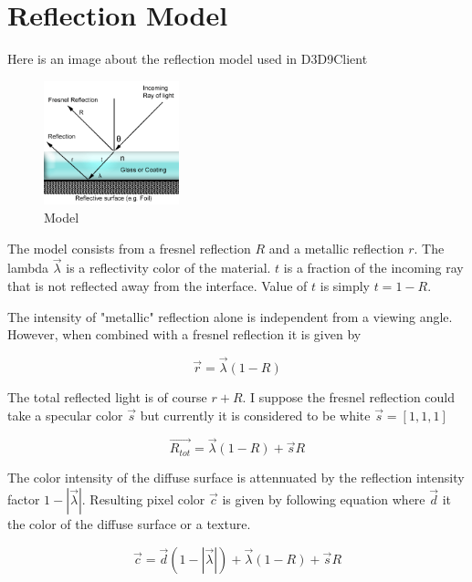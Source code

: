 \documentclass[twocolumn]{report}
\newenvironment{twocol}[0]{%
\begin{list}{}{%
\onecolumn
\setlength{\leftmargin}{0cm}%
\setlength{\rightmargin}{0cm}%
}%
\item[]}{\end{list}}
\begin{document}
\begin{twocol}
\newpage

\section*{Reflection Model}

Here is an image about the reflection model used in D3D9Client

\begin{figure}[h]
	\centering
	\includegraphics[width=0.35\textwidth]{Fresnel.png}
	\caption{Model}
\end{figure}

The model consists from a fresnel reflection $R$ and a metallic reflection $r$. The lambda $\vec{\lambda}$ is a reflectivity color of the material. $t$ is a fraction of the incoming ray that is not reflected away from the interface. Value of $t$ is simply $t=1-R$.

The intensity of "metallic" reflection alone is independent from a viewing angle. However, when combined with a fresnel reflection it is given by

\begin{equation}
 \vec{r} = \vec{\lambda}(1-R)
\end{equation}

The total reflected light is of course $r+R$. I suppose the fresnel reflection could take a specular color $\vec{s}$ but currently it is considered to be white $\vec{s}=[1,1,1]$

\begin{equation}
\vec{R_{tot}} = \vec{\lambda}(1-R)+\vec{s}R
\end{equation}

The color intensity of the diffuse surface is attennuated by the reflection intensity factor $1-|\vec{\lambda}|$. Resulting pixel color $\vec{c}$ is given by following equation where $\vec{d}$ it the color of the diffuse surface or a texture. 

\begin{equation}
\vec{c} = \vec{d}(1-|\vec{\lambda}|) + \vec{\lambda}(1-R) + \vec{s}R
\end{equation}


\end{twocol}
\end{document}
